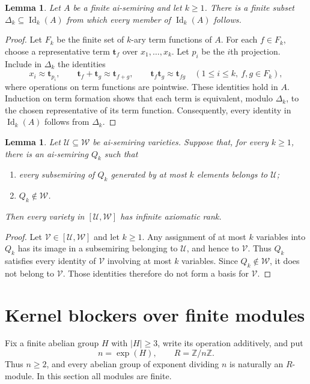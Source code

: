 \documentclass[11pt,reqno]{amsart}
\newtheorem{lemma}[theorem]{Lemma}
\theoremstyle{definition}
\numberwithin{equation}{section}
\newcommand{\Id}{\operatorname{Id}}
\newcommand{\expon}{\operatorname{exp}}
\newcommand{\Z}{\mathbb{Z}}
\newcommand{\bt}{\mathbf{t}}
\newcommand{\calU}{\mathcal{U}}
\newcommand{\calV}{\mathcal{V}}
\newcommand{\calW}{\mathcal{W}}
\renewcommand{\leq}{\leqslant}
\renewcommand{\geq}{\geqslant}
\begin{document}
\begin{lemma}\label{lem:finitevariable}
Let $A$ be a finite ai-semiring and let $k\geq 1$. There is a finite subset $\Delta_k\subseteq\Id_k(A)$ from which every member of $\Id_k(A)$ follows.
\end{lemma}
\begin{proof}
Let $F_k$ be the finite set of $k$-ary term functions of $A$. For each $f\in F_k$, choose a representative term $\bt_f$ over $x_1,\ldots,x_k$. Let $p_i$ be the $i$th projection. Include in $\Delta_k$ the identities
\[
 x_i\approx\bt_{p_i},\qquad
 \bt_f+\bt_g\approx\bt_{f+g},\qquad
 \bt_f\bt_g\approx\bt_{fg}
 \quad(1\leq i\leq k,\ f,g\in F_k),
\]
where operations on term functions are pointwise. These identities hold in $A$. Induction on term formation shows that each term is equivalent, modulo $\Delta_k$, to the chosen representative of its term function. Consequently, every identity in $\Id_k(A)$ follows from $\Delta_k$.
\end{proof}

\begin{lemma}\label{lem:local}
Let $\calU\subseteq\calW$ be ai-semiring varieties. Suppose that, for every $k\geq 1$, there is an ai-semiring $Q_k$ such that
\begin{enumerate}[label=\textup{(\roman*)},leftmargin=2.4em]
\item every subsemiring of $Q_k$ generated by at most $k$ elements belongs to $\calU$;
\item $Q_k\notin\calW$.
\end{enumerate}
Then every variety in $[\calU,\calW]$ has infinite axiomatic rank.
\end{lemma}
\begin{proof}
Let $\calV\in[\calU,\calW]$ and let $k\geq 1$. Any assignment of at most $k$ variables into $Q_k$ has its image in a subsemiring belonging to $\calU$, and hence to $\calV$. Thus $Q_k$ satisfies every identity of $\calV$ involving at most $k$ variables. Since $Q_k\notin\calW$, it does not belong to $\calV$. Those identities therefore do not form a basis for $\calV$.
\end{proof}

\section{Kernel blockers over finite modules}\label{sec:modules}
Fix a finite abelian group $H$ with $|H|\geq 3$, write its operation additively, and put
\[
 n=\expon(H),\qquad R=\Z/n\Z.
\]
Thus $n\geq 2$, and every abelian group of exponent dividing $n$ is naturally an $R$-module. In this section all modules are finite.
\end{document}
